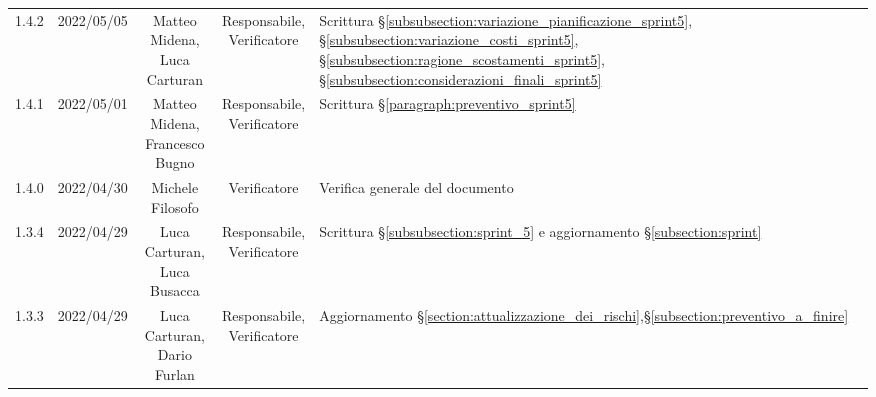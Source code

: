 \begin{center}
\begin{longtable}[c]{c | c | c | c | p{5cm}}
		1.4.2                                                      & 2022/05/05 & \Shortunderstack{Matteo Midena,                                                                                                                                                                     \\Luca Carturan} & \Shortunderstack{Responsabile,\\Verificatore} & Scrittura §\ref{subsubsection:variazione_pianificazione_sprint5}, §\ref{subsubsection:variazione_costi_sprint5}, §\ref{subsubsection:ragione_scostamenti_sprint5}, §\ref{subsubsection:considerazioni_finali_sprint5}\\
		1.4.1                                                      & 2022/05/01 & \Shortunderstack{Matteo Midena,                                                                                                                                                                     \\Francesco Bugno} & \Shortunderstack{Responsabile,\\Verificatore} & Scrittura §\ref{paragraph:preventivo_sprint5}\\
		1.4.0                                                      & 2022/04/30 & Michele Filosofo                       & Verificatore   & Verifica generale del documento                                                                                                           \\
		1.3.4                                                      & 2022/04/29 & \Shortunderstack{Luca Carturan,                                                                                                                                                                     \\Luca Busacca} & \Shortunderstack{Responsabile,\\Verificatore} & Scrittura §\ref{subsubsection:sprint_5} e aggiornamento §\ref{subsection:sprint}\\
		1.3.3                                                      & 2022/04/29 & \Shortunderstack{Luca Carturan,                                                                                                                                                                     \\Dario Furlan} & \Shortunderstack{Responsabile,\\Verificatore} & Aggiornamento §\ref{section:attualizzazione_dei_rischi},§\ref{subsection:preventivo_a_finire}\\

\end{longtable}
\end{center}
